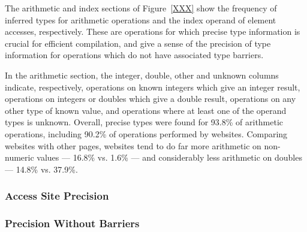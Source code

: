 The arithmetic and index sections of Figure~\ref{XXX} show the frequency
of inferred types for arithmetic operations and the index operand of
element accesses, respectively.
These are operations for which precise type information is crucial
for efficient compilation, and give a sense of the precision of type
information for operations which do not have associated type barriers.

In the arithmetic section, the integer, double, other and unknown columns indicate,
respectively,
operations on known integers which give an integer result,
operations on integers or doubles which give a double result,
operations on any other type of known value,
and operations where at least one of the operand types is unknown.
Overall, precise types were found for 93.8\% of arithmetic operations,
including 90.2\% of operations performed by websites.
Comparing websites with other pages, websites tend to do far more
arithmetic on non-numeric values --- 16.8\% vs. 1.6\% ---
and considerably less arithmetic on doubles --- 14.8\% vs. 37.9\%.

\subsubsection{Access Site Precision}

\subsubsection{Precision Without Barriers}


